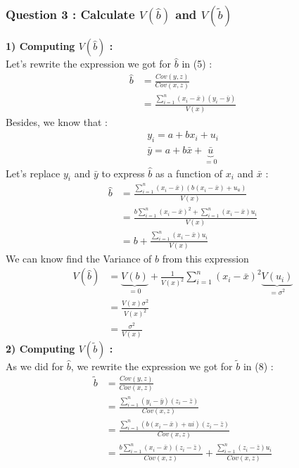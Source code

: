 \documentclass{article}
\begin{document}
\subsubsection{Question 3 : Calculate $V(\hat{b}) $ and $V(\tilde{b})$}
\textbf{1) Computing $V(\hat{b})$ :}\\
Let's rewrite the expression we got for $\hat{b}$ in (5) :
\begin{equation}
\begin{aligned}
    \hat{b} &= \frac{Cov(y,z)}{Cov(x,z)}\\
    &= \frac{\sum_{i=1}^n(x_i-\bar{x})(y_i-\bar{y})}{V(x)}
\end{aligned}
\end{equation}
Besides, we know that : 
\begin{equation}
\begin{aligned}
    y_i = a + bx_i + u_i\\
    \bar{y} = a + b\bar{x} + \underbrace{\bar{u}}_{=0 }
\end{aligned}
\end{equation}
Let's replace $y_i$ and $\bar{y}$ to express $\hat{b}$ as a function of $x_i$ and $\bar{x}$ : 
\begin{equation}
\begin{aligned}
    \hat{b} &= \frac{\sum_{i=1}^n(x_i-\bar{x})(b(x_i-\bar{x}) + u_u)}{V(x)} \\
    &= \frac{b\sum_{i=1}^n(x_i-\bar{x})^2 + \sum_{i=1}^n(x_i-\bar{x})u_i}{V(x)}\\
    &= b + \frac{\sum_{i=1}^n(x_i-\bar{x})u_i}{V(x)}
\end{aligned}
\end{equation}
We can know find the Variance of $\hat{b}$ from this expression
\begin{equation}
\begin{aligned}
    V(\hat{b}) &= \underbrace{V(b)}_{=0}+ \frac{1}{V(x)^2}{\sum_{i=1}^n(x_i-\bar{x})^2\underbrace{V(u_i)}_{=\sigma^2}}\\
    &=\frac{V(x)\sigma^2}{V(x)^2}\\
    &=\frac{\sigma^2}{V(x)}
\end{aligned}
\end{equation}
\textbf{2) Computing $V(\tilde{b})$ :}\\
As we did for $\hat{b}$, we rewrite the expression we got for $\tilde{b}$ in (8) : 
\begin{equation}
\begin{aligned}
    \tilde{b} &= \frac{Cov(y,z)}{Cov(x,z)}\\
    &= \frac{\sum_{i=1}^n(y_i-\bar{y})(z_i-\bar{z})}{Cov(x,z)}\\
    &= \frac{\sum_{i=1}^n(b(x_i-\bar{x})+ui)(z_i-\bar{z})}{Cov(x,z)}\\
    &=\frac{b\sum_{i=1}^n(x_i-\bar{x})(z_i-\bar{z})}{Cov(x,z)} + \frac{\sum_{i=1}^n(z_i-\bar{z})u_i}{Cov(x,z)}\\ 
\end{aligned}
\end{equation}
\end{document}
